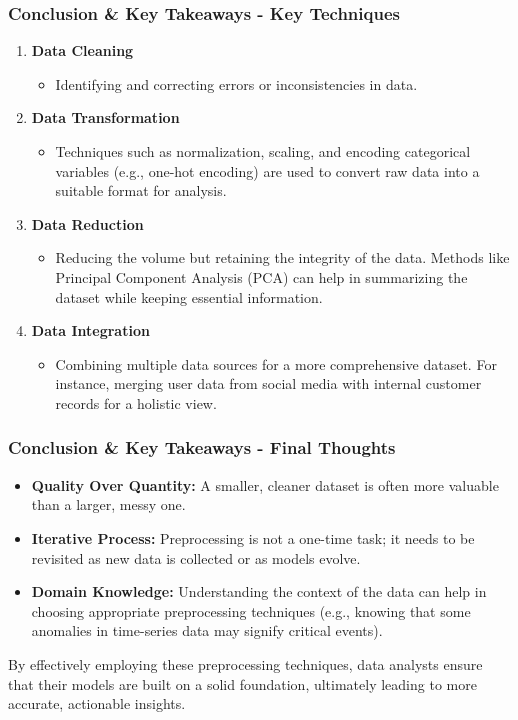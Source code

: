 \documentclass[aspectratio=169]{beamer}
\begin{document}
\begin{frame}[fragile]
    \frametitle{Conclusion \& Key Takeaways - Key Techniques}
    \begin{enumerate}
        \item \textbf{Data Cleaning} 
            \begin{itemize}
                \item Identifying and correcting errors or inconsistencies in data.
            \end{itemize}
        \item \textbf{Data Transformation}
            \begin{itemize}
                \item Techniques such as normalization, scaling, and encoding categorical variables (e.g., one-hot encoding) are used to convert raw data into a suitable format for analysis.
            \end{itemize}
        \item \textbf{Data Reduction}
            \begin{itemize}
                \item Reducing the volume but retaining the integrity of the data. Methods like Principal Component Analysis (PCA) can help in summarizing the dataset while keeping essential information.
            \end{itemize}
        \item \textbf{Data Integration}
            \begin{itemize}
                \item Combining multiple data sources for a more comprehensive dataset. For instance, merging user data from social media with internal customer records for a holistic view.
            \end{itemize}
    \end{enumerate}
\end{frame}

\begin{frame}[fragile]
    \frametitle{Conclusion \& Key Takeaways - Final Thoughts}
    \begin{itemize}
        \item \textbf{Quality Over Quantity:} A smaller, cleaner dataset is often more valuable than a larger, messy one.
        \item \textbf{Iterative Process:} Preprocessing is not a one-time task; it needs to be revisited as new data is collected or as models evolve.
        \item \textbf{Domain Knowledge:} Understanding the context of the data can help in choosing appropriate preprocessing techniques (e.g., knowing that some anomalies in time-series data may signify critical events).
    \end{itemize}
    By effectively employing these preprocessing techniques, data analysts ensure that their models are built on a solid foundation, ultimately leading to more accurate, actionable insights.
\end{frame}
\end{document}
